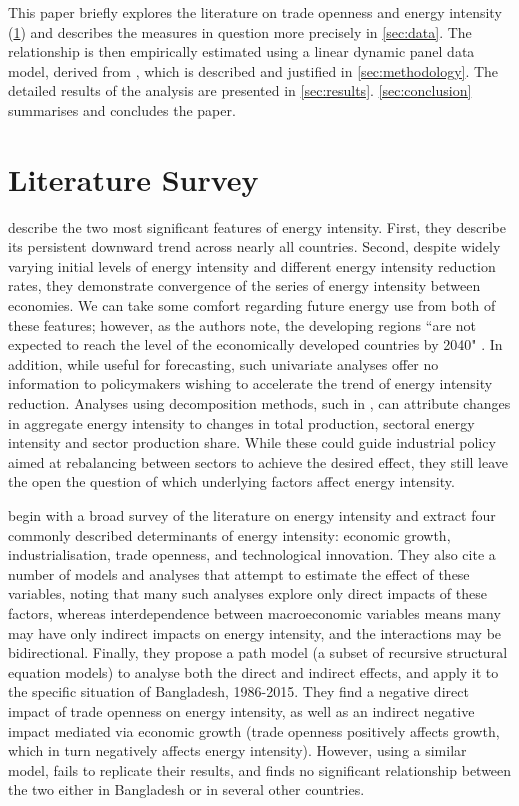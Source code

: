 \documentclass[12pt,a4paper]{article}
\begin{document}
This paper briefly explores the literature on trade openness and energy intensity (\cref{sec:literature}) and describes the measures in question more precisely in \cref{sec:data}.
The relationship is then empirically estimated using a linear dynamic panel data model, derived from \cite{arellanoTestsSpecificationPanel1991}, which is described and justified in \cref{sec:methodology}.
The detailed results of the analysis are presented in \cref{sec:results}. \cref{sec:conclusion} summarises and concludes the paper.

\section{Literature Survey}\label{sec:literature}

\cite{ederAnalysisEnergyIntensity2018} describe the two most significant features of energy intensity. First, they describe its persistent downward trend across nearly all countries.
Second, despite widely varying initial levels of energy intensity and different energy intensity reduction rates, they demonstrate convergence of the series of energy intensity between economies.
We can take some comfort regarding future energy use from both of these features; however, as the authors note, the developing regions ``are not expected to reach the level of the economically developed countries by 2040" \citep[p. 1971]{ederAnalysisEnergyIntensity2018}.
In addition, while useful for forecasting, such univariate analyses offer no information to policymakers wishing to accelerate the trend of energy intensity reduction. 
Analyses using decomposition methods, such in \cite{liuEightMethodsDecomposing2003}, can attribute changes in aggregate energy intensity to changes in total production, sectoral energy intensity and sector production share. While these could guide industrial policy aimed at rebalancing between sectors to achieve the desired effect, they still leave the open the question of which underlying factors affect energy intensity.

\cite{panHowIndustrializationTrade2019} begin with a broad survey of the literature on energy intensity and extract four commonly described determinants of energy intensity: economic growth, industrialisation, trade openness, and technological innovation.
They also cite a number of models and analyses that attempt to estimate the effect of these variables, noting that many such analyses explore only direct impacts of these factors, whereas interdependence between macroeconomic variables means many may have only indirect impacts on energy intensity, and the interactions may be bidirectional.
Finally, they propose a path model (a subset of recursive structural equation models) to analyse both the direct and indirect effects, and apply it to the specific situation of Bangladesh, 1986-2015.
They find a negative direct impact of trade openness on energy intensity, as well as an indirect negative impact mediated via economic growth (trade openness positively affects growth, which in turn negatively affects energy intensity).
However, using a similar model, \cite{siardPathModelEnergy2020} fails to replicate their results, and finds no significant relationship between the two either in Bangladesh or in several other countries.
\end{document}
